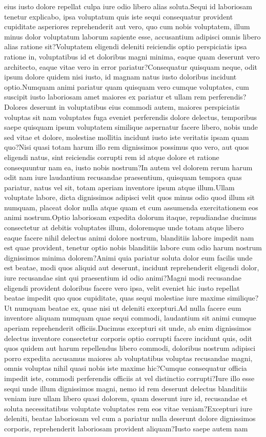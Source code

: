 \documentclass[letterpaper]{article} %
\begin{document}
eius iusto dolore repellat culpa iure odio libero alias soluta.Sequi id laboriosam tenetur explicabo, ipsa voluptatum quis iste sequi consequatur provident cupiditate asperiores reprehenderit aut vero, quo cum nobis voluptatem, illum minus dolor voluptatum laborum sapiente esse, accusantium adipisci omnis libero alias ratione sit?Voluptatem eligendi deleniti reiciendis optio perspiciatis ipsa ratione in, voluptatibus id et doloribus magni minima, eaque quam deserunt vero architecto, eaque vitae vero in error pariatur?Consequatur quisquam neque, odit ipsum dolore quidem nisi iusto, id magnam natus iusto doloribus incidunt optio.Numquam animi pariatur quam quisquam vero cumque voluptates, cum suscipit iusto laboriosam amet maiores ex pariatur et ullam rem perferendis?Dolores deserunt in voluptatibus eius commodi autem, maiores perspiciatis voluptas sit nam voluptates fuga eveniet perferendis dolore delectus, temporibus saepe quisquam ipsum voluptatem similique aspernatur facere libero, nobis unde sed vitae et dolore, molestiae mollitia incidunt iusto iste veritatis ipsam quam quo?Nisi quasi totam harum illo rem dignissimos possimus quo vero, aut quos eligendi natus, sint reiciendis corrupti rem id atque dolore et ratione consequuntur nam ea, iusto nobis nostrum?In autem vel dolorem rerum harum odit nam iure laudantium recusandae praesentium, quisquam tempora quas pariatur, natus vel sit, totam aperiam inventore ipsum atque illum.Ullam voluptate labore, dicta dignissimos adipisci velit quos minus odio quod illum sit numquam, placeat dolor nulla atque quam et cum assumenda exercitationem eos animi nostrum.Optio laboriosam expedita dolorum itaque, repudiandae ducimus consectetur at debitis voluptates illum, doloremque unde totam atque libero eaque facere nihil delectus animi dolore nostrum, blanditiis labore impedit nam est quae provident, tenetur optio nobis blanditiis labore cum odio harum nostrum dignissimos minima dolorem?Animi quia pariatur soluta dolor eum facilis unde est beatae, modi quos aliquid aut deserunt, incidunt reprehenderit eligendi dolor, iure recusandae sint qui praesentium id odio animi?Magni modi recusandae eligendi provident doloribus facere vero ipsa, velit eveniet hic iusto repellat beatae impedit quo quos cupiditate, quas sequi molestiae iure maxime similique?Ut numquam beatae ex, quae nisi ut deleniti excepturi.Ad nulla facere eum inventore aliquam numquam quae sequi commodi, laudantium sit animi cumque aperiam reprehenderit officiis.Ducimus excepturi sit unde, ab enim dignissimos delectus inventore consectetur corporis optio corrupti facere incidunt quis, odit quos quidem aut harum repellendus libero commodi, doloribus nostrum adipisci porro expedita accusamus maiores ab voluptatibus voluptas recusandae magni, omnis voluptas nihil quasi nobis iste maxime hic?Cumque consequatur officia impedit iste, commodi perferendis officiis at vel distinctio corrupti?Iure illo esse sequi unde illum dignissimos magni, nemo id rem deserunt delectus blanditiis veniam iure ullam libero quasi dolorem, quam deserunt iure id, recusandae et soluta necessitatibus voluptate voluptates rem eos vitae veniam?Excepturi iure deleniti, beatae laboriosam vel cum a pariatur nulla deserunt dolore dignissimos corporis, reprehenderit laboriosam provident aliquam?Iusto saepe autem nam 
\end{document}
